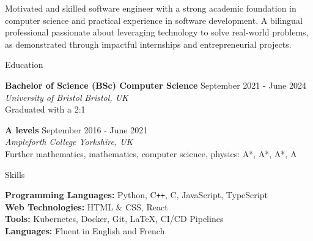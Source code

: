 \documentclass{resume} %
\begin{document}


Motivated and skilled software engineer with a strong academic foundation in computer science and practical experience in software development. A bilingual professional passionate about leveraging technology to solve real-world problems, as demonstrated through impactful internships and entrepreneurial projects.



\begin{rSection}{Education}

{\bf Bachelor of Science (BSc) Computer Science} \hfill {September 2021 - June 2024} \\
\textit{University of Bristol} \hfill \textit{Bristol, UK} \\
Graduated with a 2:1

{\bf A levels} \hfill {September 2016 - June 2021} \\
\textit{Ampleforth College} \hfill \textit{Yorkshire, UK} \\
Further mathematics, mathematics, computer science, physics: A*, A*, A*, A

\end{rSection}


\begin{rSection}{Skills}

{\bf Programming Languages:} Python, C\texttt{++}, C, JavaScript, TypeScript \\
{\bf Web Technologies:} HTML \& CSS, React \\
{\bf Tools:} Kubernetes, Docker, Git, LaTeX, CI/CD Pipelines \\
{\bf Languages:} Fluent in English and French

\end{rSection}

\end{document}
